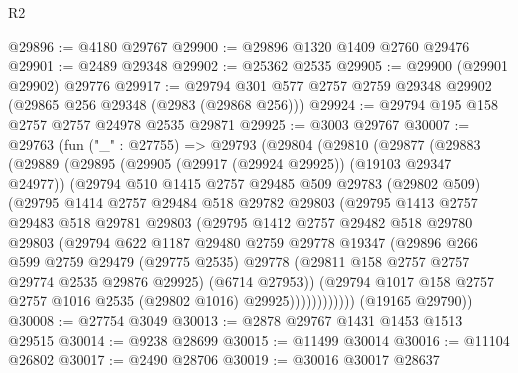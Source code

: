 \begin{lexlean}{R2}
\begin{coremodule}
@29896 := @4180 @29767
@29900 := @29896 @1320 @1409 @2760 @29476
@29901 := @2489 @29348
@29902 := @25362 @2535
@29905 := @29900 (@29901 @29902) @29776
@29917 := @29794 @301 @577 @2757 @2759 @29348 @29902 (@29865 @256 @29348 (@2983 (@29868 @256)))
@29924 := @29794 @195 @158 @2757 @2757 @24978 @2535 @29871
@29925 := @3003 @29767
@30007 := @29763
    (fun ("_" : @27755) =>
    @29793
      (@29804
        (@29810
          (@29877
            (@29883
              (@29889
                (@29895
                  (@29905 (@29917 (@29924 @29925)) (@19103 @29347 @24977))
                  (@29794
                    @510
                    @1415
                    @2757
                    @29485
                    @509
                    @29783
                    (@29802 @509)
                    (@29795
                      @1414
                      @2757
                      @29484
                      @518
                      @29782
                      @29803
                      (@29795
                        @1413
                        @2757
                        @29483
                        @518
                        @29781
                        @29803
                        (@29795
                          @1412
                          @2757
                          @29482
                          @518
                          @29780
                          @29803
                          (@29794
                            @622
                            @1187
                            @29480
                            @2759
                            @29778
                            @19347
                            (@29896
                              @266
                              @599
                              @2759
                              @29479
                              (@29775 @2535)
                              @29778
                              (@29811 @158 @2757 @2757 @29774 @2535 @29876 @29925)
                              (@6714 @27953))
                            (@29794
                              @1017
                              @158
                              @2757
                              @2757
                              @1016
                              @2535
                              (@29802 @1016)
                              @29925))))))))))))
      (@19165 @29790))
@30008 := @27754 @3049
@30013 := @2878 @29767 @1431 @1453 @1513 @29515
@30014 := @9238 @28699
@30015 := @11499 @30014
@30016 := @11104 @26802
@30017 := @2490 @28706
@30019 := @30016 @30017 @28637

\end{coremodule}
\end{lexlean}
